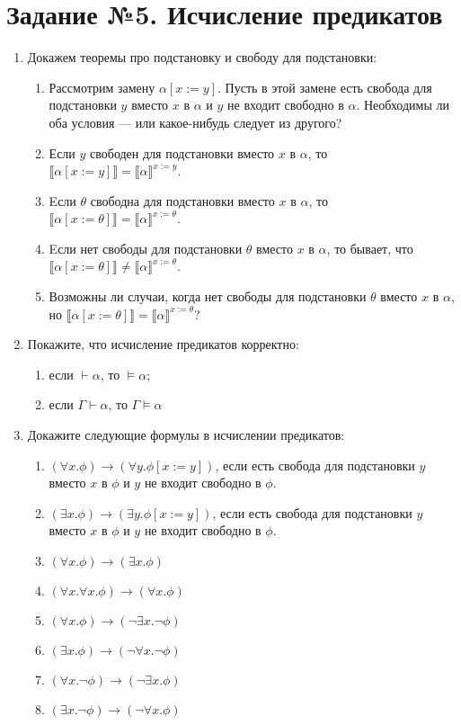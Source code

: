 \documentclass[10pt,a4paper,oneside]{article}
\begin{document}
\section*{Задание №5. Исчисление предикатов}
\begin{enumerate}
\item Докажем теоремы про подстановку и свободу для подстановки:
\begin{enumerate}
\item Рассмотрим замену $\alpha[x := y]$. Пусть в этой замене есть свобода для подстановки $y$ вместо $x$ в $\alpha$ и 
$y$ не входит свободно в $\alpha$. Необходимы ли оба условия --- или какое-нибудь следует из другого?
\item Если $y$ свободен
для подстановки вместо $x$ в $\alpha$, то
$\llbracket\alpha[x := y]\rrbracket = \llbracket\alpha\rrbracket^{ x := y }$.
\item Eсли $\theta$ свободна
для подстановки вместо $x$ в $\alpha$, то $\llbracket\alpha[x := \theta]\rrbracket = \llbracket\alpha\rrbracket^{ x := \theta }$.
\item Eсли нет свободы
для подстановки $\theta$ вместо $x$ в $\alpha$, то бывает, что 
$\llbracket\alpha[x := \theta]\rrbracket \ne \llbracket\alpha\rrbracket^{ x := \theta }$.
\item Возможны ли случаи, когда нет свободы
для подстановки $\theta$ вместо $x$ в $\alpha$, но $\llbracket\alpha[x := \theta]\rrbracket = \llbracket\alpha\rrbracket^{ x := \theta }$?
\end{enumerate}

\item Покажите, что исчисление предикатов корректно: 
\begin{enumerate}
\item если $\vdash \alpha$, то $\models\alpha$;
\item если $\Gamma\vdash\alpha$, то $\Gamma\models\alpha$
\end{enumerate}

\item Докажите следующие формулы в исчислении предикатов:
\begin{enumerate}
\item $(\forall x.\phi)\rightarrow (\forall y.\phi[x := y])$, если есть свобода для подстановки $y$ вместо $x$ в $\phi$ и $y$ не входит свободно в $\phi$.
\item $(\exists x.\phi)\rightarrow (\exists y.\phi[x := y])$, если есть свобода для подстановки $y$ вместо $x$ в $\phi$ и $y$ не входит свободно в $\phi$.
\item $(\forall x.\phi)\rightarrow (\exists x.\phi)$
\item $(\forall x.\forall x.\phi) \rightarrow (\forall x.\phi)$
\item $(\forall x.\phi) \rightarrow (\neg \exists x.\neg \phi)$ 
\item $(\exists x.\phi) \rightarrow (\neg \forall x.\neg \phi)$
\item $(\forall x.\neg\phi) \rightarrow (\neg \exists x.\phi)$ 
\item $(\exists x.\neg\phi) \rightarrow (\neg \forall x.\phi)$
\end{enumerate}


\end{enumerate}
\end{document}
